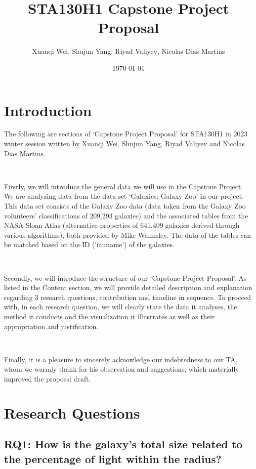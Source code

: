 \documentclass[12pt]{article}
\title{STA130H1 Capstone Project Proposal}
\author{Xuanqi Wei, Shujun Yang, Riyad Valiyev, Nicolas Dias Martins}
\date{\today}
\begin{document}
\maketitle
\thispagestyle{empty}

\newpage

\tableofcontents
\thispagestyle{empty}

\newpage

\setcounter{page}{1}

\section{Introduction}

The following are sections of `Capstone Project Proposal' for STA130H1 in 2023 winter session written by Xuanqi Wei, Shujun Yang, Riyad Valiyev and Nicolas Dias Martins.

\

\noindent Firstly, we will introduce the general data we will use in the Capstone Project. We are analyzing data from the data set `Galaxies: Galaxy Zoo' in our project. This data set consists of the Galaxy Zoo data (data taken from the Galaxy Zoo volunteers' classifications of 209,293 galaxies) and the associated tables from the NASA-Sloan Atlas (alternative properties of 641,409 galaxies derived through various algorithms), both provided by Mike Walmsley. The data of the tables can be matched based on the ID (`iauname') of the galaxies.

\

\noindent Secondly, we will introduce the structure of our `Capstone Project Proposal'. As listed in the Content section, we will provide detailed description and explanation regarding 3 research questions, contribution and timeline in sequence. To proceed with, in each research question, we will clearly state the data it analyses, the method it conducts and the visualization it illustrates as well as their appropriation and justification. 

\

\noindent Finally, it is a pleasure to sincerely acknowledge our indebtedness to our TA, whom we warmly thank for his observation and suggestions, which materially improved the proposal draft. 

\newpage
\section{Research Questions}

\subsection{RQ1: How is the galaxy's total size related to the percentage of light within the radius?}
\end{document}
